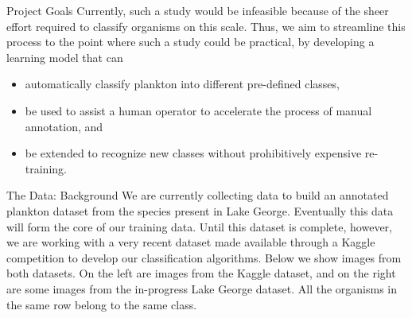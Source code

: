 \documentclass[final,hyperref={pdfpagelabels=false}]{beamer}
\begin{document}
\begin{frame}
\begin{columns}[T]
\begin{column}{.32\textwidth}
      \begin{block}{Project Goals}
        Currently, such a study would be infeasible because of the sheer effort required to classify organisms on this scale.
        Thus, we aim to streamline this process to the point where such a study could be practical, by developing a learning model
        that can
        \begin{itemize}
          \item automatically classify plankton into different pre-defined classes,
          \item be used to assist a human operator to accelerate the process of manual annotation, and
          \item be extended to recognize new classes without prohibitively expensive re-training.
        \end{itemize}
      \end{block}

      \begin{block}{The Data: Background}
        We are currently collecting data to build an annotated plankton dataset from the species present in Lake George. 
        Eventually this data
        will form the core of our training data.  Until this dataset is complete, however, we are working with a very recent dataset
        made available through a Kaggle competition to develop our classification algorithms.  Below we show images from both datasets.
        On the left are images from the Kaggle dataset, and on the right are some images from the in-progress Lake George dataset.
        All the organisms in the same row belong to the same class.

        \begin{figure}
          \begin{minipage}{.5\textwidth}
            \centering



\end{minipage}
\end{figure}
\end{block}
\end{column}
\end{columns}
\end{frame}
\end{document}
